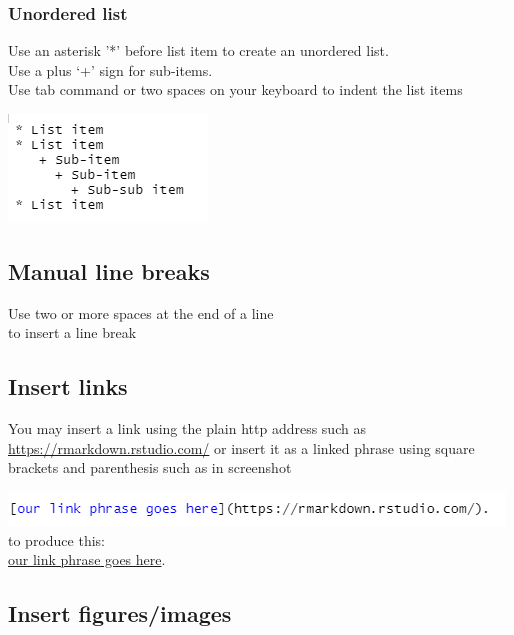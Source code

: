 \documentclass[
]{book}
\let\origfigure\figure
\let\endorigfigure\endfigure
\renewenvironment{figure}[1][2] {
    \expandafter\origfigure\expandafter[H]
} {
    \endorigfigure
}
\begin{document}
\hypertarget{unordered-list}{%
\subsubsection{Unordered list}\label{unordered-list}}

Use an asterisk '*' before list item to create an unordered list.\\
Use a plus `+' sign for sub-items.\\
Use tab command or two spaces on your keyboard to indent the list items

\begin{figure}
\centering
\includegraphics{tutorial_screenshots/unordered_list.png}
\caption{unodered list}
\end{figure}

\hypertarget{manual-line-breaks}{%
\subsection{Manual line breaks}\label{manual-line-breaks}}

Use two or more spaces at the end of a line\\
to insert a line break

\hypertarget{insert-links}{%
\subsection{Insert links}\label{insert-links}}

You may insert a link using the plain http address such as \url{https://rmarkdown.rstudio.com/} or insert it as a linked phrase using square brackets and parenthesis such as in screenshot

\includegraphics{tutorial_screenshots/link_phrase.png}\\
to produce this:\\
\href{https://rmarkdown.rstudio.com/}{our link phrase goes here}.

\hypertarget{insert-figuresimages}{%
\subsection{Insert figures/images}\label{insert-figuresimages}}
\end{document}
